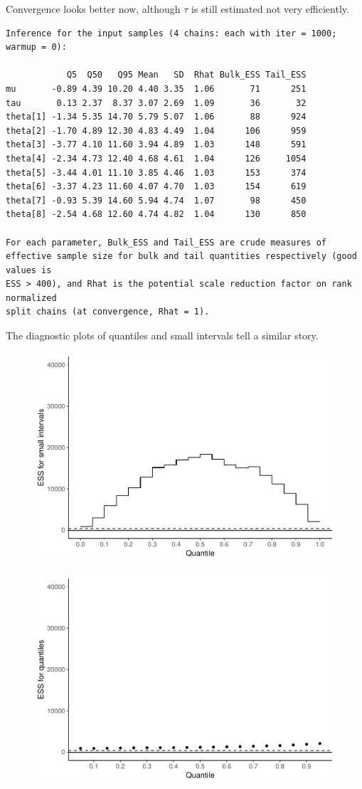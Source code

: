 \documentclass[american,]{article}
\begin{document}
Convergence looks better now, although $\tau$ is still estimated
not very efficiently.

\begin{verbatim}
Inference for the input samples (4 chains: each with iter = 1000; warmup = 0):

            Q5  Q50   Q95 Mean   SD  Rhat Bulk_ESS Tail_ESS
mu       -0.89 4.39 10.20 4.40 3.35  1.06       71      251
tau       0.13 2.37  8.37 3.07 2.69  1.09       36       32
theta[1] -1.34 5.35 14.70 5.79 5.07  1.06       88      924
theta[2] -1.70 4.89 12.30 4.83 4.49  1.04      106      959
theta[3] -3.77 4.10 11.60 3.94 4.89  1.03      148      591
theta[4] -2.34 4.73 12.40 4.68 4.61  1.04      126     1054
theta[5] -3.44 4.01 11.10 3.85 4.46  1.03      153      374
theta[6] -3.37 4.23 11.60 4.07 4.70  1.03      154      619
theta[7] -0.93 5.39 14.60 5.94 4.74  1.07       98      450
theta[8] -2.54 4.68 12.60 4.74 4.82  1.04      130      850

For each parameter, Bulk_ESS and Tail_ESS are crude measures of 
effective sample size for bulk and tail quantities respectively (good values is 
ESS > 400), and Rhat is the potential scale reduction factor on rank normalized
split chains (at convergence, Rhat = 1).
\end{verbatim}

The diagnostic plots of quantiles and small intervals tell a similar
story.

\begin{figure}[tp]
  \centering
  \includegraphics[width=0.6\linewidth]{graphics/local-ess-jags-cp-tau-longer-1.pdf}
\end{figure}

\begin{figure}[tp]
  \centering
  \includegraphics[width=0.6\linewidth]{graphics/quantile-ess-jags-cp-tau-longer-1.pdf}
\end{figure}
\end{document}
